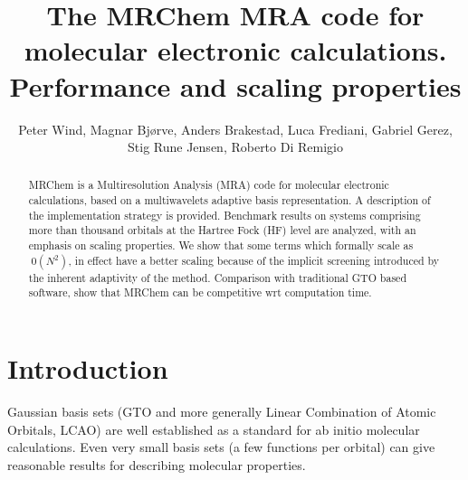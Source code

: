 \documentclass{article}
\begin{document}


\title{The MRChem MRA code for molecular electronic calculations. Performance and scaling properties}

\author{Peter Wind, Magnar Bjørve, Anders Brakestad, Luca Frediani, Gabriel Gerez, Stig Rune Jensen, Roberto Di Remigio}


\maketitle

\begin{abstract}
MRChem is a Multiresolution Analysis (MRA) code for molecular electronic calculations, based on a multiwavelets adaptive basis representation. A description of the implementation strategy is provided. Benchmark results on systems comprising more than thousand orbitals at the Hartree Fock (HF) level are analyzed, with an emphasis on scaling properties. 
We show that some terms which formally scale as $~0(N^2)$, in effect have a better scaling because of the implicit screening introduced by the inherent adaptivity of the method. Comparison with traditional GTO based software, show that MRChem can be competitive wrt computation time.

\end{abstract}


\section{Introduction}


Gaussian basis sets (GTO and more generally Linear Combination of Atomic Orbitals, LCAO) are well established as a standard for ab initio molecular calculations. 
Even very small basis sets (a few functions per orbital) can give reasonable results for describing molecular properties. 

\end{document}
